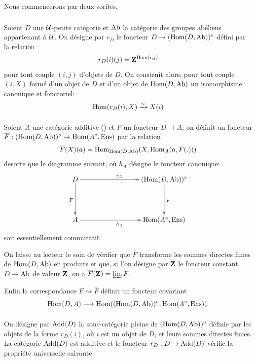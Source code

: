 \documentclass[10pt]{../fichiers-configuration-latex/smfart}
\begin{document}
Nous commencerons par deux sorites.

\subsubsection{}
Soient $D$ une ${\mathcal U}$-petite catégorie et $\operatorname{Ab}$ la catégorie des groupes
abéliens appartenant à ${\mathcal U}$. On désigne par $r_D$ le foncteur $D \to (\Hom
(D, \Ab))^{\circ}$ défini par la relation
$$
r_D (i)(j) = \mathbf{Z}^{\operatorname{Hom}(i, j)}
$$
pour tout couple $(i, j)$ d'objets de $D$. On construit alors, pour tout
couple $(i, X)$ formé d'un objet de $D$ et d'un objet de $\operatorname{Hom}(D, \operatorname{Ab})$ un
isomorphisme canonique et fonctoriel:
$$
\operatorname{Hom}(r_D(i), X) \xrightarrow{\sim} X(i)
$$

\paragraph{}
Soient $A$ une catégorie additive (\cf {}) et $F$ un foncteur $D \to A$;
on définit un foncteur $\bar{F} : (\Hom (D, \Ab))^{\circ} \to \Hom(A^{\circ},
\Ens)$ par la relation
$$
\overline{F}(X)(a) = \operatorname{Hom}_{\operatorname{Hom} (D, \operatorname{Ab})} (X, \operatorname{Hom}_A (a, F(.)))
$$
de\pageoriginale sorte que le diagramme suivant, où $h_A$ désigne le foncteur
canonique:
\[
\xymatrix@C=3cm@R=1.5cm{
D  \ar[r]^{r_D} \ar[d]_{F}& (\Hom(D,\Ab))^{\circ} \ar[d]^{\bar{F}}\\
A  \ar[r]_{h_A}       & \Hom(A^{\circ},\Ens)
}
\]
soit essentiellement commutatif.

On laisse au lecteur le soin de vérifier que $\bar{F}$ transforme les sommes
directes finies de $\operatorname{Hom}(D, \operatorname{Ab})$ en produits et que, si l'on désigne par
$\mathbf{Z}$ le foncteur constant $D \to \Ab$ de valeur $\mathbf{Z}$, on a $\overline{F}(\mathbf{Z}) =
\varprojlim F$.

Enfin la correspondance $F\rightsquigarrow  \bar{F}$ définit un
foncteur covariant
$$
\Hom(D, A) \to \Hom((\Hom(D, \Ab))^{\circ},
\Hom(A^{\circ}, \Ens)){\quoi}.
$$

\paragraph{}
On désigne par $\operatorname{Add}(D)$ la sous-catégorie pleine de
$(\operatorname{Hom}(D, \operatorname{Ab}))^{\circ}$ définie par les objets de la forme $r_D(i)$, où
$i$ est un objet de $D$, et leurs sommes directes finies. La catégorie
$\operatorname{Add}(D)$ est additive et le foncteur $r_D : D \to \Add(D)$ vérifie la
propriété universelle suivante:
\end{document}
